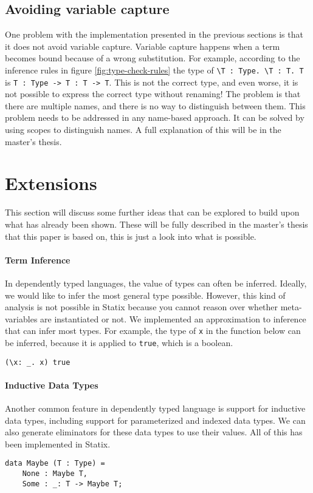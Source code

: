 \documentclass[a4paper,UKenglish,cleveref, autoref, thm-restate]{oasics-v2021}
\begin{document}
\subsection{Avoiding variable capture}
One problem with the implementation presented in the previous sections is that it does not avoid variable capture. Variable capture happens when a term becomes bound because of a wrong substitution. For example, according to the inference rules in figure \ref{fig:type-check-rules} the type of \verb|\T : Type. \T : T. T| is \verb|T : Type -> T : T -> T|. This is not the correct type, and even worse, it is not possible to express the correct type without renaming! The problem is that there are multiple names, and there is no way to distinguish between them. This problem needs to be addressed in any name-based approach. It can be solved by using scopes to distinguish names. A full explanation of this will be in the master's thesis\cite{thesis}. 

\section{Extensions}
\label{sec:extensions}
This section will discuss some further ideas that can be explored to build upon what has already been shown. These will be fully described in the master's thesis\cite{thesis} that this paper is based on, this is just a look into what is possible.

\paragraph*{Term Inference}
In dependently typed languages, the value of types can often be inferred. Ideally, we would like to infer the most general type possible. However, this kind of analysis is not possible in Statix because you cannot reason over whether meta-variables are instantiated or not. We implemented an approximation to inference that can infer most types. For example, the type of \verb|x| in the function below can be inferred, because it is applied to \verb|true|, which is a boolean.
\begin{lstlisting}
(\x: _. x) true
\end{lstlisting}

\paragraph*{Inductive Data Types}
Another common feature in dependently typed language is support for inductive data types, including support for parameterized and indexed data types. We can also generate eliminators for these data types to use their values. All of this has been implemented in Statix. 
\begin{lstlisting}
data Maybe (T : Type) = 
    None : Maybe T,
    Some : _: T -> Maybe T;
\end{lstlisting}
\end{document}
